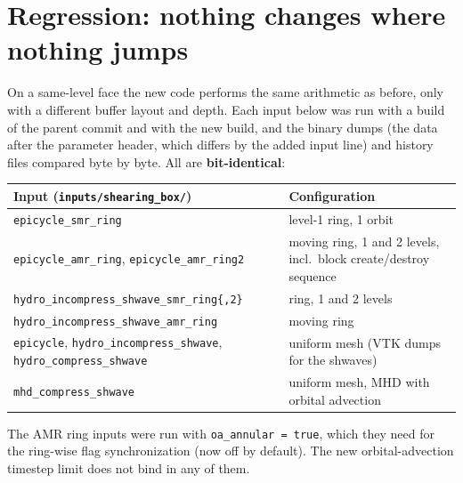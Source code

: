 \documentclass[11pt]{article}
\newcommand{\code}[1]{\texttt{#1}}
\newcommand{\file}[1]{\texttt{\small #1}}
\begin{document}
\section{Regression: nothing changes where nothing jumps}
\label{sec:regression}
On a same-level face the new code performs the same arithmetic as before, only with a
different buffer layout and depth. Each input below was run with a build of the parent
commit and with the new build, and the binary dumps (the data after the parameter header,
which differs by the added input line) and history files compared byte by byte. All are
\textbf{bit-identical}:

\begin{center}
\small
\begin{tabular}{@{}>{\raggedright\arraybackslash}p{7.6cm}p{6.6cm}@{}}
\toprule
Input (\file{inputs/shearing\_box/}) & Configuration \\
\midrule
\file{epicycle\_smr\_ring} & level-1 ring, 1 orbit \\
\file{epicycle\_amr\_ring}, \file{epicycle\_amr\_ring2} & moving ring, 1 and 2 levels,
  incl.\ block create/destroy sequence \\
\file{hydro\_incompress\_shwave\_smr\_ring\{,2\}} & ring, 1 and 2 levels \\
\file{hydro\_incompress\_shwave\_amr\_ring} & moving ring \\
\file{epicycle}, \file{hydro\_incompress\_shwave}, \file{hydro\_compress\_shwave} &
  uniform mesh (VTK dumps for the shwaves) \\
\file{mhd\_compress\_shwave} & uniform mesh, MHD with orbital advection \\
\bottomrule
\end{tabular}
\end{center}

\noindent
The AMR ring inputs were run with \code{oa\_annular = true}, which they need for the
ring-wise flag synchronization (now off by default). The new orbital-advection timestep
limit does not bind in any of them.

\end{document}
